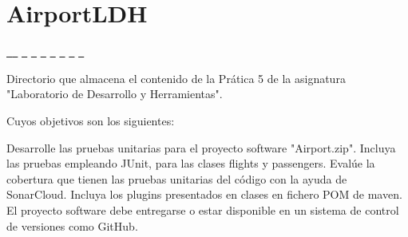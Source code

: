 \chapter{Airport\+LDH}
\hypertarget{md__r_e_a_d_m_e}{}\label{md__r_e_a_d_m_e}
\label{md__r_e_a_d_m_e_autotoc_md0}%
%
 \href{https://sonarcloud.io/summary/new_code?id=alu0101332819_AirportLDH}{\texttt{ }} \href{https://sonarcloud.io/summary/new_code?id=alu0101332819_AirportLDH}{\texttt{ }} \href{https://sonarcloud.io/summary/new_code?id=alu0101332819_AirportLDH}{\texttt{ }} \href{https://sonarcloud.io/summary/new_code?id=alu0101332819_AirportLDH}{\texttt{ }} \href{https://sonarcloud.io/summary/new_code?id=alu0101332819_AirportLDH}{\texttt{ }} \href{https://sonarcloud.io/summary/new_code?id=alu0101332819_AirportLDH}{\texttt{ }} \href{https://sonarcloud.io/summary/new_code?id=alu0101332819_AirportLDH}{\texttt{ }} \href{https://sonarcloud.io/summary/new_code?id=alu0101332819_AirportLDH}{\texttt{ }} \href{https://sonarcloud.io/summary/new_code?id=alu0101332819_AirportLDH}{\texttt{ }}

Directorio que almacena el contenido de la Prática 5 de la asignatura "{}\+Laboratorio de Desarrollo y Herramientas"{}.

Cuyos objetivos son los siguientes\+:

Desarrolle las pruebas unitarias para el proyecto software "{}\+Airport.\+zip"{}. Incluya las pruebas empleando JUnit, para las clases flights y passengers. Evalúe la cobertura que tienen las pruebas unitarias del código con la ayuda de Sonar\+Cloud. Incluya los plugins presentados en clases en fichero POM de maven. El proyecto software debe entregarse o estar disponible en un sistema de control de versiones como Git\+Hub. 